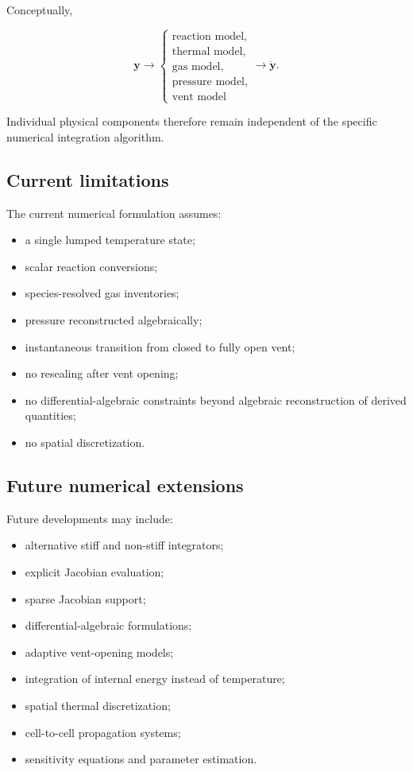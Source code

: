 Conceptually,

\begin{equation}
    \mathbf{y}
    \longrightarrow
    \begin{cases}
        \text{reaction model},\\
        \text{thermal model},\\
        \text{gas model},\\
        \text{pressure model},\\
        \text{vent model}
    \end{cases}
    \longrightarrow
    \dot{\mathbf{y}}.
\end{equation}

Individual physical components therefore remain independent of the
specific numerical integration algorithm.


\subsection{Current limitations}

The current numerical formulation assumes:

\begin{itemize}
    \item a single lumped temperature state;
    \item scalar reaction conversions;
    \item species-resolved gas inventories;
    \item pressure reconstructed algebraically;
    \item instantaneous transition from closed to fully open vent;
    \item no resealing after vent opening;
    \item no differential-algebraic constraints beyond algebraic
          reconstruction of derived quantities;
    \item no spatial discretization.
\end{itemize}


\subsection{Future numerical extensions}

Future developments may include:

\begin{itemize}
    \item alternative stiff and non-stiff integrators;
    \item explicit Jacobian evaluation;
    \item sparse Jacobian support;
    \item differential-algebraic formulations;
    \item adaptive vent-opening models;
    \item integration of internal energy instead of temperature;
    \item spatial thermal discretization;
    \item cell-to-cell propagation systems;
    \item sensitivity equations and parameter estimation.
\end{itemize}